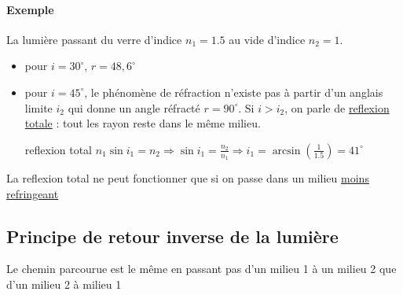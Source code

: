 \paragraph{Exemple} La lumière passant du verre d'indice $n_1=1.5$ au vide d'indice $n_2=1$. 
\begin{itemize}
	\item pour $i=30^\circ$, $r=48,6^\circ$
	\item pour $i=45^\circ$, le phénomène de réfraction n'existe pas à partir d'un anglais limite $i_2$ qui donne un angle réfracté $r=90^\circ$. Si $i > i_2$, on parle de \ul{reflexion totale} : tout les rayon reste dans le même milieu.

	\item[reflexion total] $n_1 \sin i_1 = n_2 \Rightarrow \sin i_1 = \frac{n_2}{n_1} \Rightarrow i_1 = \arcsin(\frac{1}{1.5}) = 41^\circ$
\end{itemize}

La reflexion total ne peut fonctionner que si on passe dans un milieu \ul{moins refringeant}

\subsection{Principe de retour inverse de la lumière}

Le chemin parcourue est le même en passant pas d'un milieu 1 à un milieu 2 que d'un milieu 2 à milieu 1
